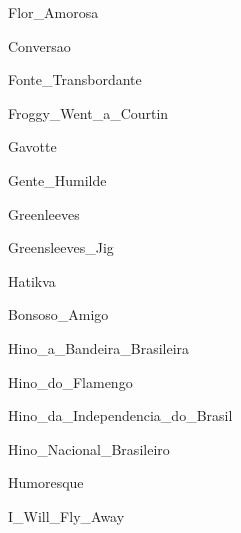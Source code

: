 \documentclass{scrartcl}
\begin{document}

{Flor_Amorosa}


{Conversao}


{Fonte_Transbordante}



{Froggy_Went_a_Courtin}



{Gavotte}



{Gente_Humilde}



{Greenleeves}


{Greensleeves_Jig}


{Hatikva}


{Bonsoso_Amigo}


{Hino_a_Bandeira_Brasileira}


{Hino_do_Flamengo}


{Hino_da_Independencia_do_Brasil}


{Hino_Nacional_Brasileiro}


{Humoresque}


{I_Will_Fly_Away}
\end{document}
